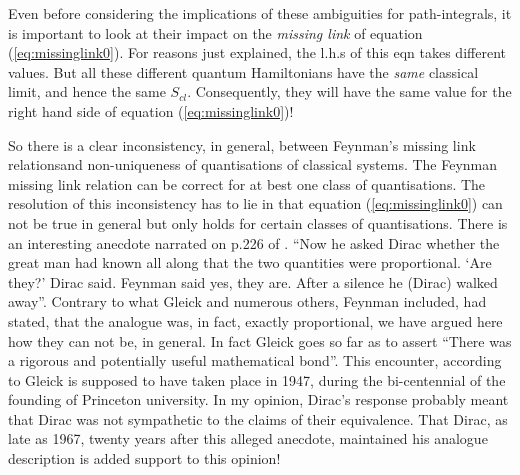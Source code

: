 \documentclass[12pt]{article}
\newcommand{\be}{\begin{equation}}
\newcommand{\ee}{\end{equation}}
\begin{document}
Even before considering the implications of these ambiguities for path-integrals, it is important to look at their impact on the \emph{missing link} of equation (\ref{eq:missinglink0}). For reasons just explained, the l.h.s of this eqn  takes different values. But all these different
quantum Hamiltonians have the \emph{same} classical limit, and hence the same $S_{cl}$. Consequently, they will have the same value for
the right hand side of equation (\ref{eq:missinglink0})! 

So there is a clear inconsistency, in general, between Feynman's  missing link relationsand non-uniqueness of quantisations of classical 
systems. 
The Feynman missing link relation can be correct for at best one class of quantisations. 
The resolution of this inconsistency has to lie in that equation (\ref{eq:missinglink0}) can not be true in general but only holds for certain 
classes of quantisations.  There is an interesting anecdote narrated on p.226 of \cite{gleick}. ``Now he asked Dirac whether the great man 
had known all along that the
two quantities were proportional. `Are they?' Dirac said. Feynman said yes, they are. After a silence he (Dirac) walked away''. Contrary to
what Gleick and numerous others, Feynman included, had stated, that the analogue was, in fact, exactly proportional, we have argued here 
how they can not be, in general. In fact Gleick goes so far as to assert ``There was a rigorous and potentially useful mathematical bond''.
This encounter, according to Gleick is supposed to have taken place in 1947, during the bi-centennial of the founding of Princeton university.
In my opinion, Dirac's response probably meant that Dirac was not sympathetic to the claims of their equivalence. That Dirac, as late as 1967,
twenty years after this alleged anecdote, maintained his analogue description \cite{diracbook4r} is added support to this opinion!
\end{document}
